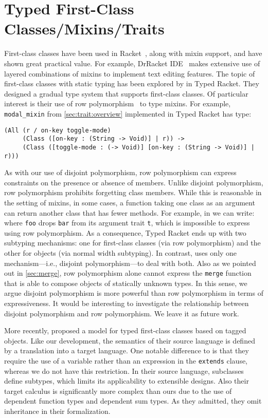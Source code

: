 \section{Typed First-Class Classes/Mixins/Traits}

First-class classes have been used in Racket~\citep{DBLP:conf/aplas/FlattFF06},
along with mixin support, and have shown great practical value. For example,
DrRacket IDE~\citep{DBLP:journals/jfp/FindlerCFFKSF02} makes extensive use of
layered combinations of mixins to implement text editing features. The topic of
first-class classes with static typing has been explored by
\citet{DBLP:conf/oopsla/TakikawaSDTF12} in Typed Racket. They designed a gradual
type system that supports first-class classes. Of particular interest is their
use of row polymorphism~\citep{wand1994type} to type mixins. For example,
\lstinline{modal_mixin} from \cref{sec:trait:overview} implemented in Typed
Racket has type:
\begin{lstlisting}
(All (r / on-key toggle-mode)
     (Class ([on-key : (String -> Void)] | r)) ->
     (Class ([toggle-mode : (-> Void)] [on-key : (String -> Void)] | r)))
\end{lstlisting}
As with our use of disjoint polymorphism, row polymorphism can express
constraints on the presence or absence of members. Unlike disjoint polymorphism,
row polymorphism prohibits forgetting class members. While this is reasonable in
the setting of mixins, in some cases, a function taking one class as an argument
can return another class that has fewer methods. For example, in \sedel we can write:
where \lstinline{foo} drops \lstinline{bar} from its argument trait
\lstinline{t}, which is impossible to express using row polymorphism. As a
consequence, Typed Racket ends up with two subtyping mechanisms: one for
first-class classes (via row polymorphism) and the other for objects (via normal
width subtyping). In contrast, \sedel uses only one mechanism---i.e., disjoint
polymorphism---to deal with both. Also as we pointed out in \cref{sec:merge},
row polymorphism alone cannot express the \lstinline{merge} function that is
able to compose objects of statically unknown types. In this sense, we argue
disjoint polymorphism is more powerful than row polymorphism in terms of
expressiveness. It would be interesting to investigate the relationship between
disjoint polymorphism and row polymorphism. We leave it as future work.


More recently, \citet{DBLP:conf/ecoop/LeeASP15} proposed a model for typed
first-class classes based on tagged objects. Like our development, the semantics
of their source language is defined by a translation into a target language. One
notable difference to \sedel is that they require the use of a variable rather
than an expression in the \lstinline{extends} clause, whereas we do not have
this restriction. In their source language, subclasses define subtypes, which
limits its applicability to extensible designs. Also their target calculus is
significantly more complex than ours due to the use of dependent function types
and dependent sum types. As they admitted, they omit inheritance in their
formalization.

